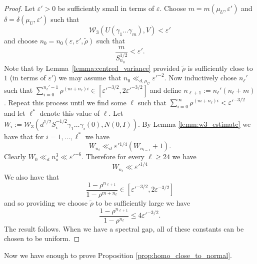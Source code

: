 \documentclass[10pt, english,oneside,reqno]{amsart}
\theoremstyle{plain}
\theoremstyle{remark}
\numberwithin{equation}{section}
\numberwithin{figure}{section}
\begin{document}
\begin{proof}
    Let $\varepsilon' > 0$ be sufficiently small in terms of $\varepsilon$. Choose $m = m(\mu_U, \varepsilon')$ and $\delta = \delta(\mu_U, \varepsilon')$ such that
    \begin{equation*}
        \mathcal{W}_3(U(\gamma_1 \dots \gamma_m), V) < \varepsilon'
    \end{equation*}
    and choose $n_0 = n_0(\varepsilon, \varepsilon' , \tilde{\rho})$ such that
    \begin{equation*}
        \frac{m}{S_{n_0}^{1/2}} < \varepsilon'.
    \end{equation*}
    Note that by Lemma~\ref{lemma:centred_variance} provided $\tilde{\rho}$ is sufficiently close to $1$ (in terms of $\varepsilon'$) we may assume that $n_0 \ll_{d, \mu_U} {\varepsilon'}^{-2}$. Now inductively chose $n_\ell'$ such that $\sum_{i=0}^{n_\ell'-1} \rho^{(m+n_\ell) i} \in [\varepsilon'^{-3/2}, 2 \varepsilon'^{-3/2}]$ and define $n_{\ell+1} := n_\ell'(n_\ell + m)$. Repeat this process until we find some $\ell$ such that $\sum_{i=0}^{\infty} \rho^{(m+n_\ell) i} < \varepsilon'^{-3/2}$ and let $\ell^*$ denote this value of $\ell$. Let $W_i := \mathcal{W}_3(d^{1/2} S_{i}^{-1/2} \gamma_1 \dots \gamma_{i}(0), N(0, I))$. By Lemma \ref{lemm:w3_estimate} we have that for $i=1, \dots, \ell^*$ we have
    \begin{equation*}
        W_{n_i} \ll_d \varepsilon'{}^{1/4} (W_{n_{i-1}} + 1).
    \end{equation*}
    Clearly $W_0 \ll_d n_o ^3 \ll {\varepsilon'}^{-6}$. Therefore for every $\ell \geq 24$ we have
    \begin{equation*}
        W_{n_\ell} \ll \varepsilon '^ {1/4}
    \end{equation*}
    We also have that
    \begin{equation*}
        \frac{1 - \rho^{n_{\ell+1}}}{1 - \rho^{m+n_\ell}} \in [\varepsilon'^{-3/2}, 2 \varepsilon^{-3/2}]
    \end{equation*}
    and so providing we choose $\tilde{\rho}$ to be sufficiently large we have
    \begin{equation*}
        \frac{1 - \rho^{n_{\ell+1}}}{1 - \rho^{n_\ell}} \leq 4 \varepsilon'^{-3/2}.
    \end{equation*}
    The result follows. When we have a spectral gap, all of these constants can be chosen to be uniform.
\end{proof}

Now we have enough to prove Proposition \ref{prop:homo_close_to_normal}.
\end{document}

